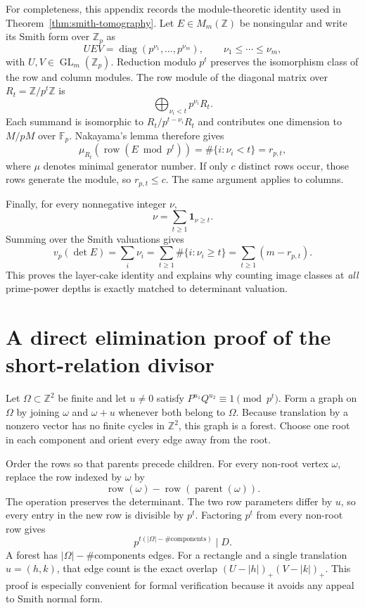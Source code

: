 \documentclass[11pt]{article}
\theoremstyle{definition}
\theoremstyle{remark}
\newcommand{\Z}{\mathbb Z}
\newcommand{\F}{\mathbb F}
\newcommand{\diag}{\operatorname{diag}}
\begin{document}
For completeness, this appendix records the module-theoretic identity used in Theorem~\ref{thm:smith-tomography}.  Let $E\in M_m(\Z)$ be nonsingular and write its Smith form over $\Z_p$ as
\[
 UE V=\diag(p^{\nu_1},\ldots,p^{\nu_m}),
 \qquad \nu_1\le\cdots\le\nu_m,
\]
with $U,V\in\operatorname{GL}_m(\Z_p)$.  Reduction modulo $p^t$ preserves the isomorphism class of the row and column modules.  The row module of the diagonal matrix over $R_t=\Z/p^t\Z$ is
\[
 \bigoplus_{\nu_i<t}p^{\nu_i}R_t.
\]
Each summand is isomorphic to $R_t/p^{t-\nu_i}R_t$ and contributes one dimension to
$M/pM$ over $\F_p$.  Nakayama's lemma therefore gives
\[
 \mu_{R_t}(\operatorname{row}(E\bmod p^t))
 =\#\{i:\nu_i<t\}=r_{p,t},
\]
where $\mu$ denotes minimal generator number.  If only $c$ distinct rows occur, those rows generate the module, so $r_{p,t}\le c$.  The same argument applies to columns.

Finally, for every nonnegative integer $\nu$,
\[
 \nu=\sum_{t\ge1}\mathbf1_{\nu\ge t}.
\]
Summing over the Smith valuations gives
\[
 v_p(\det E)
 =\sum_i\nu_i
 =\sum_{t\ge1}\#\{i:\nu_i\ge t\}
 =\sum_{t\ge1}(m-r_{p,t}).
\]
This proves the layer-cake identity and explains why counting image classes at \emph{all} prime-power depths is exactly matched to determinant valuation.

\section{A direct elimination proof of the short-relation divisor}
\label{app:elimination}

Let $\Omega\subset\Z^2$ be finite and let $u\ne0$ satisfy
$P^{u_1}Q^{u_2}\equiv1\pmod{p^t}$.  Form a graph on $\Omega$ by joining $\omega$ and $\omega+u$ whenever both belong to $\Omega$.  Because translation by a nonzero vector has no finite cycles in $\Z^2$, this graph is a forest.  Choose one root in each component and orient every edge away from the root.

Order the rows so that parents precede children.  For every non-root vertex $\omega$, replace the row indexed by $\omega$ by
\[
 \operatorname{row}(\omega)-\operatorname{row}(\operatorname{parent}(\omega)).
\]
The operation preserves the determinant.  The two row parameters differ by $u$, so every entry in the new row is divisible by $p^t$.  Factoring $p^t$ from every non-root row gives
\[
 p^{t(|\Omega|-\#\text{components})}\mid D.
\]
A forest has $|\Omega|-\#\text{components}$ edges.  For a rectangle and a single translation $u=(h,k)$, that edge count is the exact overlap
$(U-|h|)_+(V-|k|)_+$.  This proof is especially convenient for formal verification because it avoids any appeal to Smith normal form.
\end{document}
